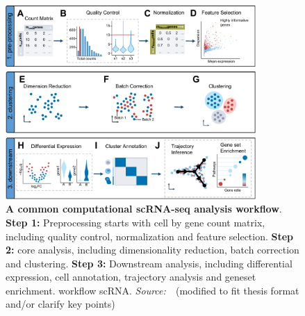 \begin{figure}[!ht]
	\centering
	\includegraphics[width=0.85\textwidth]{workflow_scRNA/fig}
	\vspace{0.1cm}
	\caption[A common computational scRNA-seq analysis workflow]{
		\textbf{A common computational scRNA-seq analysis workflow}.
		\textbf{Step 1:} Preprocessing starts with cell by gene count matrix, including quality control, normalization and feature selection.
		\textbf{Step 2:} core analysis, including dimensionality reduction, batch correction and clustering.
		\textbf{Step 3:} Downstream analysis, including differential expression, cell annotation, trajectory analysis and geneset enrichment.
	workflow scRNA. \emph{Source:~\cite{heumos2023best}}~(modified to fit thesis format and/or clarify key points)}
	\label{fig:workflow_scRNA}
\end{figure}

